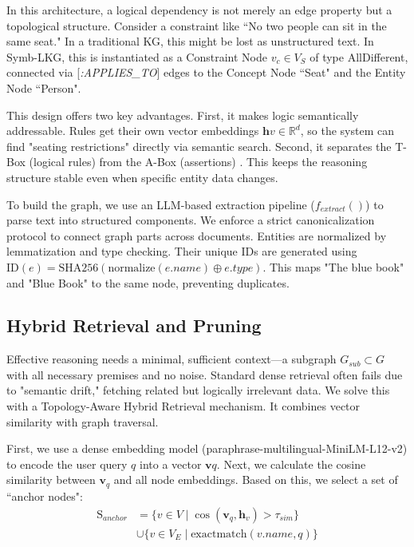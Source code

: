 \documentclass{article}
\theoremstyle{plain}
\theoremstyle{definition}
\theoremstyle{remark}
\begin{document}
In this architecture, a logical dependency is not merely an edge property but a topological structure. Consider a constraint like ``No two people can sit in the same seat." In a traditional KG, this might be lost as unstructured text. In Symb-LKG, this is instantiated as a Constraint Node $v_{c} \in V_S$ of type AllDifferent, connected via [\textit{:APPLIES\_TO}] edges to the Concept Node ``Seat" and the Entity Node ``Person".

This design offers two key advantages. First, it makes logic semantically addressable. Rules get their own vector embeddings $\mathbf{h}{v} \in \mathbb{R}^d$, so the system can find "seating restrictions" directly via semantic search. Second, it separates the T-Box (logical rules) from the A-Box (assertions) \cite{baader2003description}. This keeps the reasoning structure stable even when specific entity data changes.

To build the graph, we use an LLM-based extraction pipeline ($f_{extract}()$) to parse text into structured components. We enforce a strict canonicalization protocol to connect graph parts across documents. Entities are normalized by lemmatization and type checking. Their unique IDs are generated using $\text{ID}(e) = \text{SHA256}(\text{normalize}(e.name) \oplus e.type)$. This maps "The blue book" and "Blue Book" to the same node, preventing duplicates.

\subsection{Hybrid Retrieval and Pruning}

Effective reasoning needs a minimal, sufficient context—a subgraph $G_{sub} \subset G$ with all necessary premises and no noise. Standard dense retrieval often fails due to "semantic drift," fetching related but logically irrelevant data. We solve this with a Topology-Aware Hybrid Retrieval mechanism. It combines vector similarity with graph traversal.

First, we use a dense embedding model (paraphrase-multilingual-MiniLM-L12-v2) \cite{reimers2019sentencebertarxiv} to encode the user query $q$ into a vector $\mathbf{v}q$. Next, we calculate the cosine similarity between $\mathbf{v}_q$ and all node embeddings. Based on this, we select a set of ``anchor nodes":
\begin{equation}
    \begin{split}
        \text{S}_{anchor} &= \{ v \in V \mid \cos(\mathbf{v}_q, \mathbf{h}_v) > \tau_{sim} \} \\
&\cup \{ v \in V_E \mid \text{exactmatch}(v.name, q) \}
    \end{split}
\end{equation}
\end{document}
